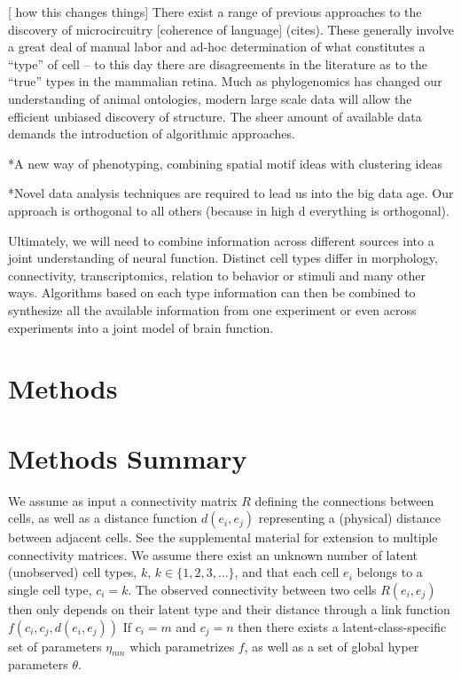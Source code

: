 \documentclass{article}
\begin{document}
[ how this changes things] There exist a range of previous approaches
to the discovery of microcircuitry [coherence of language]
(cites). These generally involve a great deal of manual labor and
ad-hoc determination of what constitutes a “type” of cell -- to this
day there are disagreements in the literature as to the “true” types
in the mammalian retina. Much as phylogenomics has changed our
understanding of animal ontologies, modern large scale data will allow
the efficient unbiased discovery of structure. The sheer amount of
available data demands the introduction of algorithmic approaches.


*A new way of phenotyping, combining spatial motif ideas with clustering ideas

*Novel data analysis techniques are required to lead us into the big
data age. Our approach is orthogonal to all others (because in high d
everything is orthogonal).

Ultimately, we will need to combine information across different
sources into a joint understanding of neural function. Distinct cell
types differ in morphology, connectivity, transcriptomics, relation to
behavior or stimuli and many other ways. Algorithms based on each type
information can then be combined to synthesize all the available
information from one experiment or even across experiments into a
joint model of brain function.


\section{Methods}
\section{Methods Summary}





We assume as input a connectivity matrix $R$ defining the connections
between cells, as well as a distance function $d(e_i, e_j)$
representing a (physical) distance between adjacent cells. See the
supplemental material for extension to multiple connectivity
matrices. We assume there exist an unknown number of latent
(unobserved) cell types, $k$, $k \in \{1, 2, 3, \dots\}$, and that
each cell $e_i$ belongs to a single cell type, $c_i = k$. The observed
connectivity between two cells $R(e_i, e_j)$ then only depends on
their latent type and their distance through a link function $f(c_i,
c_j, d(e_i, e_j))$ If $c_i=m$ and $c_j=n$ then there exists a
latent-class-specific set of parameters $\eta_{mn}$ which parametrizes
$f$, as well as a set of global hyper parameters $\theta$.
\end{document}
